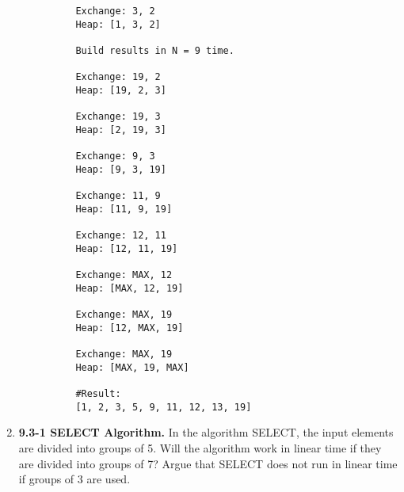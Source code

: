 \documentclass{article}
\begin{document}
\begin{enumerate}
\begin{lstlisting}
          Exchange: 3, 2
          Heap: [1, 3, 2]
          
          Build results in N = 9 time.
          
          Exchange: 19, 2
          Heap: [19, 2, 3]
          
          Exchange: 19, 3
          Heap: [2, 19, 3]
          
          Exchange: 9, 3
          Heap: [9, 3, 19]
          
          Exchange: 11, 9
          Heap: [11, 9, 19]
          
          Exchange: 12, 11
          Heap: [12, 11, 19]
          
          Exchange: MAX, 12
          Heap: [MAX, 12, 19]
          
          Exchange: MAX, 19
          Heap: [12, MAX, 19]
          
          Exchange: MAX, 19
          Heap: [MAX, 19, MAX]
          
          #Result:
          [1, 2, 3, 5, 9, 11, 12, 13, 19]
        \end{lstlisting}

        \item \textbf{9.3-1 SELECT Algorithm.}
        In the algorithm SELECT, the input elements are divided into groups of 5. Will the algorithm work in linear time if they are divided into groups of 7? Argue that SELECT does not run in linear time if groups of 3 are used.


  \end{enumerate}
\end{document}
